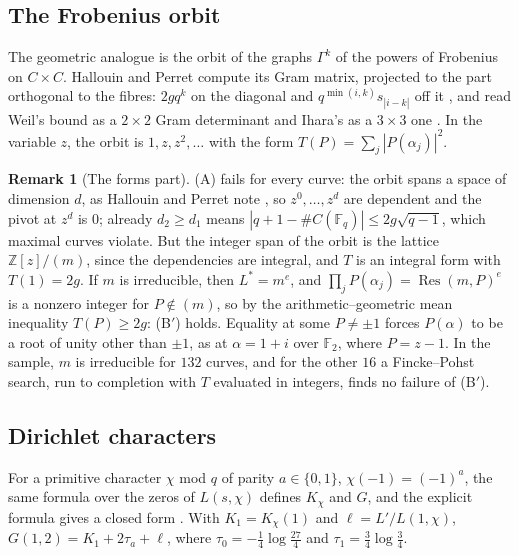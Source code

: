 \documentclass[11pt]{article}
\theoremstyle{definition}
\newtheorem*{remark}{Remark}
\newcommand{\KH}{K}
\begin{document}
\subsection{The Frobenius orbit}

The geometric analogue is the orbit of the graphs $\Gamma^k$ of the powers of
Frobenius on $C \times C$. Hallouin and Perret compute its Gram matrix, projected to the part orthogonal to the
fibres: $2gq^k$ on the diagonal and $q^{\min(i, k)} s_{|i - k|}$ off it \cite[Lemma~3]{hallouin-perret}, and read
Weil's bound as a $2 \times 2$ Gram determinant and Ihara's as a $3 \times 3$ one \cite{hallouin-perret}. In the
variable $z$, the orbit is $1, z,
z^2, \dots$ with the form $T(P) = \sum_j |P(\alpha_j)|^2$.

\begin{remark}[The forms part]
(A) fails for every curve: the orbit spans a space of dimension $d$, as Hallouin and Perret note
\cite[remark after Lemma~3]{hallouin-perret}, so $z^0, \dots, z^d$ are dependent and the pivot at $z^d$ is $0$; already
$d_2 \ge d_1$ means $|q + 1 - \#C(\mathbb F_q)| \le 2g\sqrt{q - 1}$, which maximal curves violate. But the integer span
of the orbit is the lattice $\mathbb Z[z]/(m)$, since the dependencies are integral, and $T$ is an integral form with
$T(1) = 2g$. If $m$ is irreducible, then $L^* = m^e$, and
$\prod_j P(\alpha_j) = \operatorname{Res}(m, P)^e$ is a nonzero
integer for $P \notin (m)$, so by the arithmetic--geometric
mean inequality $T(P) \ge 2g$: (B$'$) holds. Equality at some
$P \ne \pm 1$ forces $P(\alpha)$ to be a root of unity other than $\pm 1$, as at $\alpha = 1 + i$ over $\mathbb F_2$,
where $P = z - 1$. In the sample, $m$ is irreducible for $132$ curves, and for the other $16$ a Fincke--Pohst
search, run to completion with $T$ evaluated in integers, finds no failure of (B$'$).
\end{remark}

\subsection{Dirichlet characters}\label{sec:chars}

For a primitive character $\chi$ mod $q$ of parity $a \in \{0, 1\}$, $\chi(-1) = (-1)^a$, the same formula over the
zeros of $L(s, \chi)$ defines
$\KH_\chi$ and $G$, and the explicit formula gives a closed form \cite[Chapter~19]{davenport}. With $K_1 = \KH_\chi(1)$
and $\ell = L'/L(1, \chi)$, $G(1, 2) = K_1 + 2\tau_a + \ell$, where $\tau_0 = -\frac14 \log\frac{27}{4}$ and $\tau_1 =
\frac34
\log \frac34$.
\end{document}
